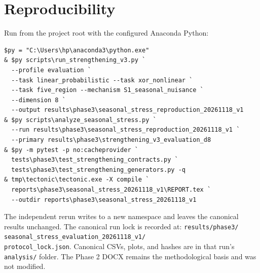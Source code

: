 \documentclass[11pt]{article}
\begin{document}
\section{Reproducibility}
Run from the project root with the configured Anaconda Python:
\begin{verbatim}
$py = "C:\Users\hp\anaconda3\python.exe"
& $py scripts\run_strengthening_v3.py `
  --profile evaluation `
  --task linear_probabilistic --task xor_nonlinear `
  --task five_region --mechanism S1_seasonal_nuisance `
  --dimension 8 `
  --output results\phase3\seasonal_stress_reproduction_20261118_v1
& $py scripts\analyze_seasonal_stress.py `
  --run results\phase3\seasonal_stress_reproduction_20261118_v1 `
  --primary results\phase3\strengthening_v3_evaluation_d8
& $py -m pytest -p no:cacheprovider `
  tests\phase3\test_strengthening_contracts.py `
  tests\phase3\test_strengthening_generators.py -q
& tmp\tectonic\tectonic.exe -X compile `
  reports\phase3\seasonal_stress_20261118_v1\REPORT.tex `
  --outdir reports\phase3\seasonal_stress_20261118_v1
\end{verbatim}
The independent rerun writes to a new namespace and leaves the canonical results unchanged.
The canonical run lock is recorded at:
\texttt{results/phase3/}\\
\texttt{seasonal\_stress\_evaluation\_20261118\_v1/}\\
\texttt{protocol\_lock.json}.
Canonical CSVs, plots, and hashes are in that run's \texttt{analysis/} folder. The Phase 2 DOCX remains the methodological basis and was not modified.
\end{document}
